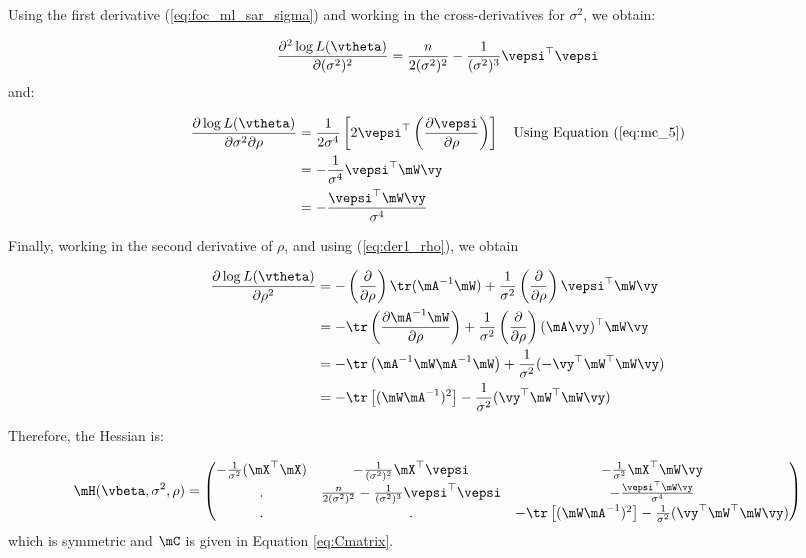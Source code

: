 \documentclass[english,12pt]{book}\usepackage[]{graphicx}\usepackage[]{xcolor}
\begin{document}
Using the first derivative (\ref{eq:foc_ml_sar_sigma}) and working in the cross-derivatives for $\sigma^2$, we obtain:

\begin{equation}\label{eq:sar_der_sigma_sigma}
	\frac{\partial^2 \log L(\vtheta)}{\partial (\sigma^2)^2}  = \frac{n}{2(\sigma^2) ^2} - \frac{1}{(\sigma^2)^3} \vepsi^\top \vepsi
\end{equation}
%
and:

\begin{equation}\label{eq:sar_der_sigma_rho}
\begin{aligned}
\frac{\partial \log L(\vtheta) }{\partial \sigma^2 \partial \rho}  & = \frac{1}{2\sigma ^ 4}\left[2\vepsi^\top \left(\frac{\partial \vepsi}{\partial \rho}\right)\right] \quad \mbox{Using Equation (\ref{eq:mc_5})}\\
& =  - \frac{1}{\sigma ^ 4}\vepsi ^\top \mW\vy \\
& =  -\frac{\vepsi^\top\mW\vy}{\sigma ^ 4}
\end{aligned}
\end{equation}

Finally, working in the second derivative of $\rho$, and using (\ref{eq:der1_rho}), we obtain

\begin{equation}\label{eq:sar_der_rho_rho}
\begin{aligned}
\frac{\partial \log L(\vtheta) }{\partial \rho ^2}  & = -\left(\frac{\partial }{\partial \rho}\right)\tr(\mA^{-1}\mW) + \frac{1}{\sigma^2}\left(\frac{\partial }{\partial \rho}\right)\vepsi^\top\mW\vy \\
& = - \tr\left( \frac{\partial \mA^{-1}\mW}{\partial \rho}\right) + \frac{1}{\sigma^2}\left(\frac{\partial }{\partial \rho}\right)(\mA\vy)^\top\mW\vy \\
& = - \tr\left( \mA^{-1}\mW\mA^{-1}\mW \right)+ \frac{1}{\sigma^2}(- \vy^{\top}\mW^{\top}\mW\vy) \\
& = - \tr\left[(\mW\mA^{-1})^2\right] - \frac{1}{\sigma^2}(\vy^{\top}\mW^{\top}\mW\vy)
\end{aligned}
\end{equation}


Therefore, the Hessian is:

\begin{equation}\label{eq:hessian_sml}
	\mH(\vbeta, \sigma^2, \rho) = 
	\begin{pmatrix}
	- \frac{1}{\sigma^2}(\mX^\top \mX) & - \frac{1}{(\sigma^2)^2} \mX^\top \vepsi & - \frac{1}{\sigma^2} \mX^\top \mW\vy \\
		 .& \frac{n}{2(\sigma^2) ^2} - \frac{1}{(\sigma^2)^3} \vepsi^\top \vepsi & -\frac{\vepsi^\top\mW\vy}{\sigma ^ 4} \\
		 .& . & - \tr\left[(\mW\mA^{-1})^2\right] - \frac{1}{\sigma^2}(\vy^{\top}\mW^{\top}\mW\vy)
	\end{pmatrix} 
\end{equation}
%
which is symmetric and $\mC$ is given in Equation \eqref{eq:Cmatrix}.
\end{document}
